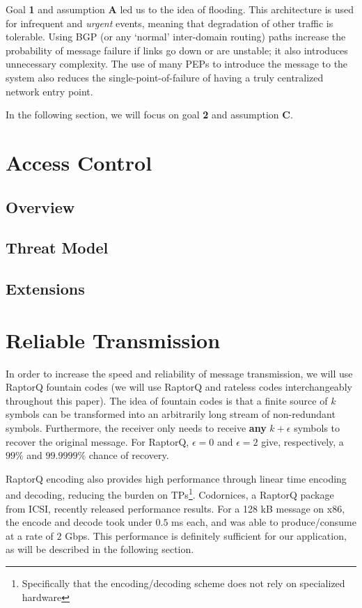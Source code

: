 Goal \textbf{1} and assumption \textbf{A} led us to the idea of flooding. This architecture is used for infrequent and \textit{urgent} events, meaning that degradation of other traffic is tolerable. Using BGP (or any `normal' inter-domain routing) paths increase the probability of message failure if links go down or are unstable; it also introduces unnecessary complexity. The use of many PEPs to introduce the message to the system also reduces the single-point-of-failure of having a truly centralized network entry point.

In the following section, we will focus on goal \textbf{2} and assumption \textbf{C}. 
\section{Access Control}\label{acl}
\subsection{Overview}

\subsection{Threat Model}
\subsection{Extensions}
\section{Reliable Transmission}\label{reliable}
In order to increase the speed and reliability of message transmission, we will use RaptorQ fountain codes (we will use RaptorQ and rateless codes interchangeably throughout this paper). The idea of fountain codes is that a finite source of $k$ symbols can be transformed into an arbitrarily long stream of non-redundant symbols. Furthermore, the receiver only needs to receive \textbf{any} $k + \epsilon$ symbols to recover the original message. For RaptorQ, $\epsilon = 0$ and $\epsilon = 2$ give, respectively, a $99\%$ and $99.9999\%$ chance of recovery.\cite{raptorq, raptorqpresent}

RaptorQ encoding also provides high performance through linear time encoding and decoding, reducing the burden on TPs\footnote{Specifically that the encoding/decoding scheme does not rely on specialized hardware}. Codornices, a RaptorQ package from ICSI, recently released performance results. For a 128 kB message on x86, the encode and decode took under $0.5$ ms each, and was able to produce/consume at a rate of $2$ Gbps\cite{raptorqperf}. This performance is definitely sufficient for our application, as will be described in the following section.


